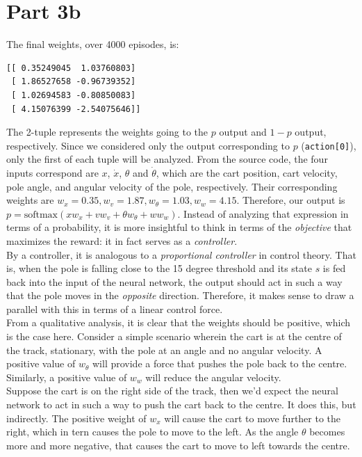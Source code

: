\documentclass{article}
\newcommand{\enterProblemHeader}[1]{
}
\newcommand{\exitProblemHeader}[1]{
}
\newcounter{homeworkProblemCounter} %
\newcommand{\homeworkProblemName}{}
\newenvironment{homeworkProblem}[1][Part \arabic{homeworkProblemCounter}]{ %
\stepcounter{homeworkProblemCounter} %
\renewcommand{\homeworkProblemName}{#1} %
\section{\homeworkProblemName} %
\enterProblemHeader{\homeworkProblemName} %
}{
\exitProblemHeader{\homeworkProblemName} %
}
\begin{document}
\begin{homeworkProblem}[Part 3b]
The final weights, over 4000 episodes, is:
\begin{verbatim}
[[ 0.35249045  1.03760803]
 [ 1.86527658 -0.96739352]
 [ 1.02694583 -0.80850083]
 [ 4.15076399 -2.54075646]]    
\end{verbatim}

The 2-tuple represents the weights going to the $p$ output and $1-p$ output, respectively. Since we considered only the output corresponding to $p$ (\verb|action[0]|), only the first of each tuple will be analyzed. From the source code, the four inputs correspond are $x$, $\dot{x}$, $\theta$ and $\dot \theta$, which are the cart position, cart velocity, pole angle, and angular velocity of the pole, respectively. Their corresponding weights are $w_x=0.35, w_v=1.87, w_{\theta}=1.03, w_w=4.15$. Therefore, our output is $p=\text{softmax}(x w_x + v w_v + \theta w_{\theta} + w w_w)$. Instead of analyzing that expression in terms of a probability, it is more insightful to think in terms of the \textit{objective} that maximizes the reward: it in fact serves as a \textit{controller}.\\

By a controller, it is analogous to a \textit{proportional controller} in control theory. That is, when the pole is falling close to the 15 degree threshold and its state $s$ is fed back into the input of the neural network, the output should act in such a way that the pole moves in the \textit{opposite} direction. Therefore, it makes sense to draw a parallel with this in terms of a linear control force.\\

From a qualitative analysis, it is clear that the weights should be positive, which is the case here. Consider a simple scenario wherein the cart is at the centre of the track, stationary, with the pole at an angle and no angular velocity. A positive value of $w_{\theta}$ will provide a force that pushes the pole back to the centre. Similarly, a positive value of $w_{w}$ will reduce the angular velocity.\\

Suppose the cart is on the right side of the track, then we'd expect the neural network to act in such a way to push the cart back to the centre. It does this, but indirectly. The positive weight of $w_x$ will cause the cart to move further to the right, which in tern causes the pole to move to the left. As the angle $\theta$ becomes more and more negative, that causes the cart to move to left towards the centre.\\


\end{homeworkProblem}
\end{document}
